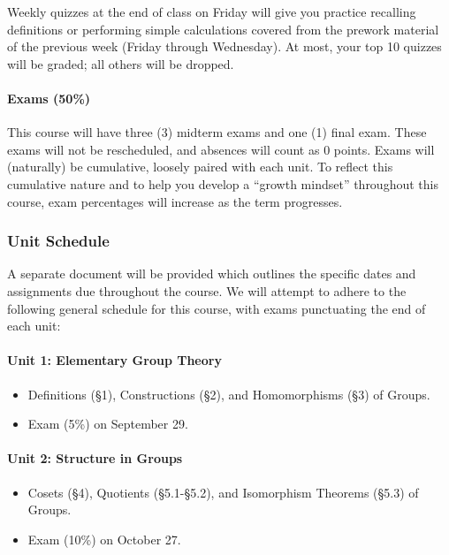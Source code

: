 \documentclass[
  twoside]{article}
\providecommand{\tightlist}{%
  \setlength{\itemsep}{0pt}\setlength{\parskip}{0pt}}
\begin{document}
Weekly quizzes at the end of class on Friday will give you practice
recalling definitions or performing simple calculations covered from the
prework material of the previous week (Friday through Wednesday). At
most, your top 10 quizzes will be graded; all others will be dropped.

\paragraph{Exams (50\%)}\label{exams-50}

This course will have three (3) midterm exams and one (1) final exam.
These exams will not be rescheduled, and absences will count as 0
points. Exams will (naturally) be cumulative, loosely paired with each
unit. To reflect this cumulative nature and to help you develop a
``growth mindset'' throughout this course, exam percentages will
increase as the term progresses.

\subsubsection{Unit Schedule}\label{unit-schedule}

A separate document will be provided which outlines the specific dates
and assignments due throughout the course. We will attempt to adhere to
the following general schedule for this course, with exams punctuating
the end of each unit:

\paragraph{Unit 1: Elementary Group
Theory}\label{unit-1-elementary-group-theory}

\begin{itemize}
\tightlist
\item
  Definitions (§1), Constructions (§2), and Homomorphisms (§3) of
  Groups.
\item
  Exam (5\%) on September 29.
\end{itemize}

\paragraph{Unit 2: Structure in
Groups}\label{unit-2-structure-in-groups}

\begin{itemize}
\tightlist
\item
  Cosets (§4), Quotients (§5.1-§5.2), and Isomorphism Theorems (§5.3) of
  Groups.
\item
  Exam (10\%) on October 27.
\end{itemize}
\end{document}
